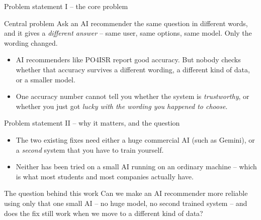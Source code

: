 \documentclass[aspectratio=169,12pt]{beamer}
\begin{document}
\begin{frame}{Problem statement I -- the core problem}
\begin{alertblock}{Central problem}
Ask an AI recommender the same question in different words, and it gives a
\emph{different answer} -- same user, same options, same model. Only the
wording changed.
\end{alertblock}

\vspace{0.6em}
\begin{itemize}
  \item AI recommenders like PO4ISR report good accuracy. But nobody checks
        whether that accuracy survives a different wording, a different
        kind of data, or a smaller model.
  \item One accuracy number cannot tell you whether the system is
        \emph{trustworthy}, or whether you just got \emph{lucky with the
        wording you happened to choose}.
\end{itemize}
\end{frame}

\begin{frame}{Problem statement II -- why it matters, and the question}
\begin{itemize}
  \item The two existing fixes need either a huge commercial AI (such as
        Gemini), or a \emph{second} system that you have to train yourself.
  \item Neither has been tried on a small AI running on an ordinary
        machine -- which is what most students and most companies actually
        have.
\end{itemize}

\vspace{0.8em}
\begin{block}{The question behind this work}
Can we make an AI recommender more reliable using only that one small AI --
no huge model, no second trained system -- and does the fix still work when
we move to a different kind of data?
\end{block}
\end{frame}
\end{document}
